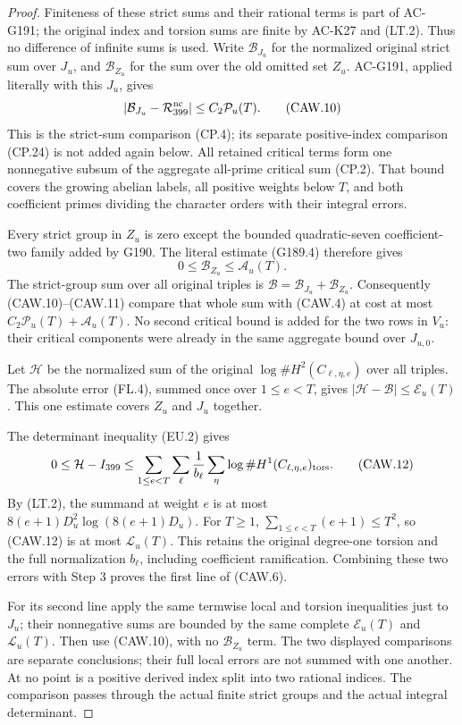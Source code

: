 \begin{proof}
Finiteness of these strict sums and their rational terms is part
of AC-G191; the original index and torsion sums are finite by
AC-K27 and (LT.2).  Thus no difference of infinite sums is used.
Write $\mathcal B_{J_u}$ for the normalized original strict sum
over $J_u$, and $\mathcal B_{Z_u}$ for the sum over the old
omitted set $Z_u$.  AC-G191, applied literally with this $J_u$,
gives
\[
       |\mathcal B_{J_u}-\mathcal R_{399}^{\rm nc}|
                            \leq C_2\mathcal P_u(T).
 \tag{CAW.10}
\]
This is the strict-sum comparison (CP.4); its separate
positive-index comparison (CP.24) is not added again below.
All retained critical terms form one nonnegative subsum of the
aggregate all-prime critical sum (CP.2).
That bound covers the growing abelian labels, all positive
weights below $T$, and both coefficient primes dividing the
character orders with their integral errors.

Every strict group in $Z_u$ is zero except the bounded
quadratic-seven coefficient-two family added by G190.
The literal estimate (G189.4) therefore gives
\[
                 0\leq\mathcal B_{Z_u}\leq\mathcal A_u(T).
 \tag{CAW.11}
\]
The strict-group sum over all original triples is
$\mathcal B=\mathcal B_{J_u}+\mathcal B_{Z_u}$.
Consequently (CAW.10)--(CAW.11) compare that whole sum with
(CAW.4) at cost at most $C_2\mathcal P_u(T)+\mathcal A_u(T)$.
No second critical bound is added for the two rows in $V_u$:
their critical components were already in the same aggregate
bound over $J_{u,0}$.

Let $\mathcal H$ be the normalized sum of the original
$\log\#H^2(C_{\ell,\eta,e})$ over all triples.
The absolute error (FL.4), summed once over $1\leq e<T$,
gives $|\mathcal H-\mathcal B|\leq\mathcal E_u(T)$.
This one estimate covers $Z_u$ and $J_u$ together.

The determinant inequality (EU.2) gives
\[
 0\leq\mathcal H-I_{399}
 \leq\sum_{1\leq e<T}\sum_\ell\frac1{b_\ell}
      \sum_\eta\log\#H^1(C_{\ell,\eta,e})_{\rm tors}.
 \tag{CAW.12}
\]
By (LT.2), the summand at weight $e$ is at most
$8(e+1)D_u^2\log(8(e+1)D_u)$.
For $T\geq1$, $\sum_{1\leq e<T}(e+1)\leq T^2$,
so (CAW.12) is at most $\mathcal L_u(T)$.
This retains the original degree-one torsion and the full
normalization $b_\ell$, including coefficient ramification.
Combining these two errors with Step 3 proves the first line
of (CAW.6).

For its second line apply the same termwise local and torsion
inequalities just to $J_u$; their nonnegative sums are bounded
by the same complete $\mathcal E_u(T)$ and $\mathcal L_u(T)$.
Then use (CAW.10), with no $\mathcal B_{Z_u}$ term.
The two displayed comparisons are separate conclusions; their
full local errors are not summed with one another.
At no point is a positive derived index split into two rational
indices.  The comparison passes through the actual finite
strict groups and the actual integral determinant.


\end{proof}
